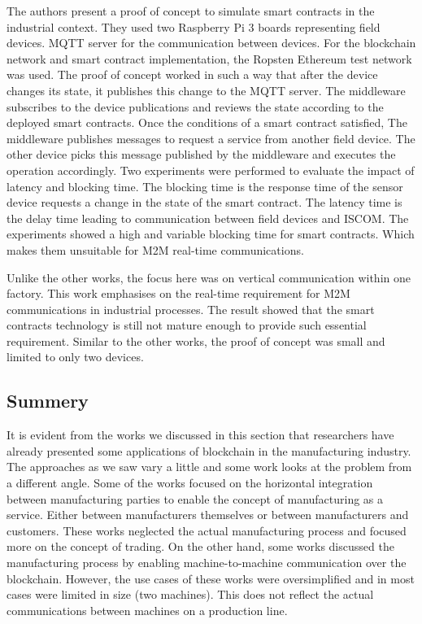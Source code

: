 \documentclass[runningheads]{llncs}
\begin{document}
\bigbreak

\noindent
 The authors present a proof of concept to simulate smart contracts in the industrial context. They used two Raspberry Pi 3 boards representing field devices. MQTT server for the communication between devices. For the blockchain network and smart contract implementation, the Ropsten Ethereum test network was used. The proof of concept worked in such a way that after the device changes its state, it publishes this change to the MQTT server. The middleware subscribes to the device publications and reviews the state according to the deployed smart contracts. Once the conditions of a smart contract satisfied, The middleware publishes messages to request a service from another field device. The other device picks this message published by the middleware and executes the operation accordingly. Two experiments were performed to evaluate the impact of latency and blocking time. The blocking time is the response time of the sensor device requests a change in the state of the smart contract.  The latency time is the delay time leading to communication between field devices and ISCOM. The experiments showed a high and variable blocking time for smart contracts. Which makes them unsuitable for M2M real-time communications. 
\bigbreak

\noindent
Unlike the other works, the focus here was on vertical communication within one factory. This work emphasises on the real-time requirement for M2M communications in industrial processes. The result showed that the smart contracts technology is still not mature enough to provide such essential requirement. Similar to the other works, the proof of concept was small and limited to only two devices.

\subsection{Summery}
It is evident from the works we discussed in this section that researchers have already presented some applications of blockchain in the manufacturing industry. The approaches as we saw vary a little and some work looks at the problem from a different angle. Some of the works focused on the horizontal integration between manufacturing parties to enable the concept of manufacturing as a service. Either between manufacturers themselves or between manufacturers and customers. These works neglected the actual manufacturing process and focused more on the concept of trading. On the other hand, some works discussed the manufacturing process by enabling machine-to-machine communication over the blockchain. However, the use cases of these works were oversimplified and in most cases were limited in size (two machines). This does not reflect the actual communications between machines on a production line. 
\bigbreak
\end{document}
